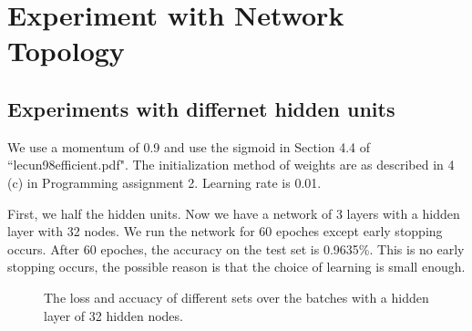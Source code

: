 \documentclass{article} %
\begin{document}
\section{Experiment with Network Topology}

\subsection{Experiments with differnet hidden units}
We use a momentum of 0.9 and use the sigmoid in Section 4.4 of ``lecun98efficient.pdf". The initialization method of weights are as described in 4 (c) in Programming assignment 2. Learning rate is 0.01.

First, we half the hidden units. Now we have a network of 3 layers with a hidden layer with 32 nodes. We run the network for 60 epoches except early stopping occurs. After 60 epoches, the accuracy on the test set is 0.9635\%. This is no early stopping occurs, the possible reason is that the choice of learning is small enough.

\begin{figure} [!htbp]
	
	\caption{The loss and accuacy of different sets over the batches with a hidden layer of 32 hidden nodes. }  
	
\end{figure}
\end{document}
